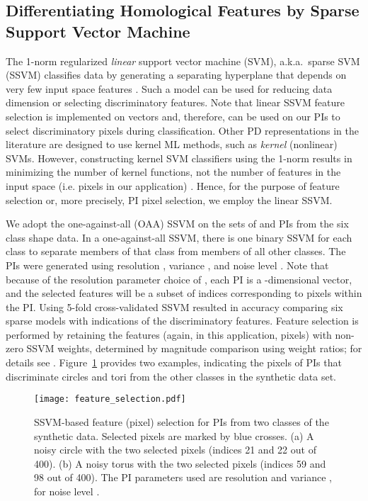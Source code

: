 \documentclass[11pt]{article}
\begin{document}
\subsection{Differentiating Homological Features by Sparse Support Vector Machine}
\label{feature_selection:sec}

The 1-norm regularized \textit{linear} support vector machine (SVM), a.k.a.\ sparse SVM (SSVM) classifies data by generating a separating hyperplane that depends on very few input space features \citep{Bradley1998,Zhu2003,Zhang2010b}. Such a model can be used for reducing data dimension or selecting discriminatory features. Note that linear SSVM feature selection is implemented on vectors and, therefore, can be used on our PIs to select discriminatory pixels during classification. 
Other PD representations in the literature \citep{reininghaus2015stable,pachauri2011topology} are designed to use kernel ML methods, such as \textit{kernel} (nonlinear) SVMs. However, constructing kernel SVM classifiers using the 1-norm results in minimizing the number of kernel functions, not the number of features in the input space (i.e. pixels in our application) \citep{Fung2004}. Hence, for the purpose of feature selection or, more precisely, PI pixel selection, we employ the linear SSVM.

We adopt the one-against-all (OAA) SSVM on the sets of  and  PIs from the six class shape data. In a one-against-all SSVM, there is one binary SSVM for each class to separate members of that class from members of all other classes. The PIs were generated using resolution , variance , and noise level . Note that because of the resolution parameter choice of , each PI is a -dimensional vector, and the selected features will be a subset of indices corresponding to pixels within the PI. Using 5-fold cross-validated SSVM resulted in  accuracy comparing six sparse models with indications of the discriminatory features. Feature selection is performed by retaining the features (again, in this application, pixels) with non-zero SSVM weights, determined by magnitude comparison using weight ratios; for details see \citet{chep}. Figure~\ref{fig:FeatureSelection1} provides two examples, indicating the pixels of  PIs that discriminate circles and tori from the other classes in the synthetic data set.

\begin{figure}[H]
\centering
\texttt{[image: feature\_selection.pdf]}
\caption{SSVM-based feature (pixel) selection for  PIs from two classes of the synthetic data. Selected pixels are marked by blue crosses. (a) A noisy circle with the two selected pixels (indices 21 and 22 out of 400). (b) A noisy torus with the two selected pixels (indices 59 and 98 out of 400). The PI parameters used are resolution  and variance , for noise level .}
\label{fig:FeatureSelection1}
\end{figure}
\end{document}
